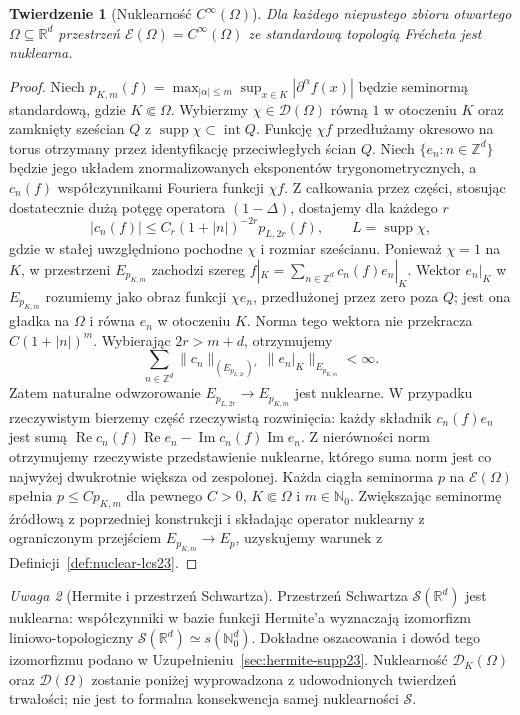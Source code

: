 \documentclass[11pt,a4paper]{article}
\numberwithin{equation}{section}
\theoremstyle{plain}
\newtheorem{twierdzenie}{Twierdzenie}[section]
\theoremstyle{definition}
\theoremstyle{remark}
\newtheorem{uwaga}[twierdzenie]{Uwaga}
\newcommand{\R}{\mathbb R}
\newcommand{\N}{\mathbb N}
\DeclareMathOperator{\supp}{supp}
\begin{document}
\begin{twierdzenie}[Nuklearność $C^\infty(\Omega)$]
\label{thm:nuclear-cinfty23}
Dla każdego niepustego zbioru otwartego $\Omega\subseteq\R^d$
przestrzeń $\mathcal E(\Omega)=C^\infty(\Omega)$
ze standardową topologią Frécheta jest nuklearna.
\end{twierdzenie}
\begin{proof}
Niech $p_{K,m}(f)=\max_{|\alpha|\le m}\sup_{x\in K}
|\partial^\alpha f(x)|$ będzie seminormą standardową,
gdzie $K\Subset\Omega$. Wybierzmy
$\chi\in\mathcal D(\Omega)$ równą $1$ w otoczeniu $K$
oraz zamknięty sześcian $Q$ z $\supp\chi\subset\operatorname{int}Q$.
Funkcję $\chi f$ przedłużamy okresowo na torus otrzymany
przez identyfikację przeciwległych ścian $Q$.
Niech $\{e_n:n\in\mathbb Z^d\}$ będzie jego układem
znormalizowanych eksponentów trygonometrycznych,
a $c_n(f)$ współczynnikami Fouriera funkcji $\chi f$.
Z całkowania przez części, stosując dostatecznie dużą
potęgę operatora $(1-\Delta)$, dostajemy dla każdego $r$
\[
 |c_n(f)|\le C_r(1+|n|)^{-2r}
 p_{L,2r}(f),\qquad L=\supp\chi,
\]
gdzie w stałej uwzględniono pochodne $\chi$ i rozmiar
sześcianu. Ponieważ $\chi=1$ na $K$, w przestrzeni $E_{p_{K,m}}$
zachodzi szereg
$f|_K=\sum_{n\in\mathbb Z^d}c_n(f)e_n|_K$.
Wektor $e_n|_K$ w $E_{p_{K,m}}$ rozumiemy jako obraz
funkcji $\chi e_n$, przedłużonej przez zero poza $Q$;
jest ona gładka na $\Omega$ i równa $e_n$ w otoczeniu $K$.
Norma tego wektora nie przekracza $C(1+|n|)^m$.
Wybierając $2r>m+d$, otrzymujemy
\[
 \sum_{n\in\mathbb Z^d}
 \|c_n\|_{(E_{p_{L,2r}})'}\,
 \|e_n|_K\|_{E_{p_{K,m}}}<\infty.
\]
Zatem naturalne odwzorowanie
$E_{p_{L,2r}}\to E_{p_{K,m}}$ jest nuklearne.
W przypadku rzeczywistym bierzemy część rzeczywistą
rozwinięcia: każdy składnik $c_n(f)e_n$ jest sumą
$\operatorname{Re}c_n(f)\operatorname{Re}e_n-
\operatorname{Im}c_n(f)\operatorname{Im}e_n$.
Z nierówności norm otrzymujemy rzeczywiste przedstawienie
nuklearne, którego suma norm jest co najwyżej dwukrotnie
większa od zespolonej.
Każda ciągła seminorma $p$ na $\mathcal E(\Omega)$
spełnia $p\le C p_{K,m}$ dla pewnego $C>0$, $K\Subset\Omega$
i $m\in\N_0$. Zwiększając seminormę źródłową
z poprzedniej konstrukcji i składając operator nuklearny
z ograniczonym przejściem $E_{p_{K,m}}\to E_p$,
uzyskujemy warunek z Definicji~\ref{def:nuclear-lcs23}.
\end{proof}

\begin{uwaga}[Hermite i przestrzeń Schwartza]
\label{rem:hermite-nuclear23}
Przestrzeń Schwartza $\mathcal S(\R^d)$ jest nuklearna:
współczynniki w bazie funkcji Hermite'a wyznaczają
izomorfizm liniowo-topologiczny
$\mathcal S(\R^d)\simeq s(\N_0^d)$.
Dokładne oszacowania i dowód tego izomorfizmu podano
w Uzupełnieniu~\ref{sec:hermite-supp23}.
Nuklearność $\mathcal D_K(\Omega)$ oraz
$\mathcal D(\Omega)$ zostanie poniżej wyprowadzona
z udowodnionych twierdzeń trwałości; nie jest to
formalna konsekwencja samej nuklearności $\mathcal S$.
\end{uwaga}
\end{document}
